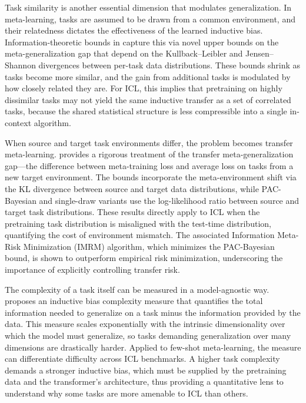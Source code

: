 \documentclass[11pt]{article}
\begin{document}
Task similarity is another essential dimension that modulates generalization. In meta-learning, tasks are assumed to be drawn from a common environment, and their relatedness dictates the effectiveness of the learned inductive bias. Information-theoretic bounds in \cite{ref27} capture this via novel upper bounds on the meta-generalization gap that depend on the Kullback--Leibler and Jensen--Shannon divergences between per-task data distributions. These bounds shrink as tasks become more similar, and the gain from additional tasks is modulated by how closely related they are. For ICL, this implies that pretraining on highly dissimilar tasks may not yield the same inductive transfer as a set of correlated tasks, because the shared statistical structure is less compressible into a single in-context algorithm.

When source and target task environments differ, the problem becomes transfer meta-learning. \cite{ref28} provides a rigorous treatment of the transfer meta-generalization gap---the difference between meta-training loss and average loss on tasks from a new target environment. The bounds incorporate the meta-environment shift via the KL divergence between source and target data distributions, while PAC-Bayesian and single-draw variants use the log-likelihood ratio between source and target task distributions. These results directly apply to ICL when the pretraining task distribution is misaligned with the test-time distribution, quantifying the cost of environment mismatch. The associated Information Meta-Risk Minimization (IMRM) algorithm, which minimizes the PAC-Bayesian bound, is shown to outperform empirical risk minimization, underscoring the importance of explicitly controlling transfer risk.

The complexity of a task itself can be measured in a model-agnostic way. \cite{ref29} proposes an inductive bias complexity measure that quantifies the total information needed to generalize on a task minus the information provided by the data. This measure scales exponentially with the intrinsic dimensionality over which the model must generalize, so tasks demanding generalization over many dimensions are drastically harder. Applied to few-shot meta-learning, the measure can differentiate difficulty across ICL benchmarks. A higher task complexity demands a stronger inductive bias, which must be supplied by the pretraining data and the transformer's architecture, thus providing a quantitative lens to understand why some tasks are more amenable to ICL than others.
\end{document}
